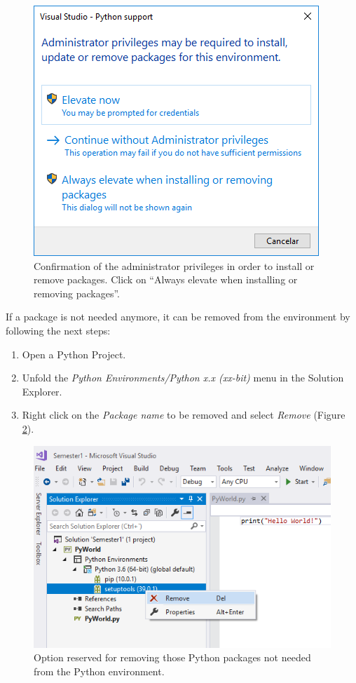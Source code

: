 \begin{figure}[h]
	\centering
	\includegraphics[width=0.6 \textwidth]{Figures/PPM15.png}
	\caption{Confirmation of the administrator privileges in order to install or remove packages. Click on ``Always elevate when installing or removing packages''.}
	\label{fig:pkg15}
\end{figure}

\newpage
If a package is not needed anymore, it can be removed from the environment by following the next steps:

\begin{enumerate}
	\item Open a Python Project.
	\item Unfold the \textit{Python Environments/Python x.x (xx-bit)} menu in the Solution Explorer.
	\item Right click on the \textit{Package name} to be removed and select \textit{Remove} (Figure \ref{fig:pkg2}). 
\end{enumerate}

\begin{figure}[h]
    \centering
    \includegraphics[width= 0.9 \textwidth]{Figures/PPM2V1.png}
    \caption{Option reserved for removing those Python packages not needed from the Python environment.}
    \label{fig:pkg2}
\end{figure}

